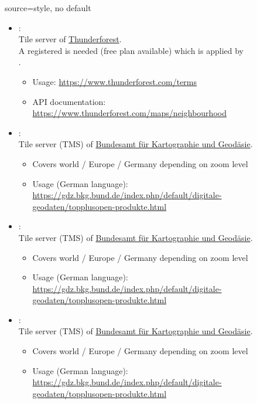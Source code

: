 \begin{docMrcKey}[supply]{source}{=}{style, no default}
\begin{itemize}
\clearpage
  \item{}:\\
    Tile server of \href{https://www.thunderforest.com}{Thunderforest}.\\
    A registered  is needed (free plan available)
    which is applied by\\
    .
    \begin{itemize}
    \item Usage: \url{https://www.thunderforest.com/terms}
    \item API documentation: \url{https://www.thunderforest.com/maps/neighbourhood}
    \end{itemize}

  \item{}:\\
    Tile server (TMS) of \href{https://www.bkg.bund.de}{Bundesamt f\"{u}r Kartographie und Geod\"{a}sie}.
    \begin{itemize}
    \item Covers world / Europe / Germany depending on zoom level
    \item Usage (German language): \url{https://gdz.bkg.bund.de/index.php/default/digitale-geodaten/topplusopen-produkte.html}
    \end{itemize}

  \item{}:\\
    Tile server (TMS) of \href{https://www.bkg.bund.de}{Bundesamt f\"{u}r Kartographie und Geod\"{a}sie}.
    \begin{itemize}
    \item Covers world / Europe / Germany depending on zoom level
    \item Usage (German language): \url{https://gdz.bkg.bund.de/index.php/default/digitale-geodaten/topplusopen-produkte.html}
    \end{itemize}

\clearpage
  \item{}:\\
    Tile server (TMS) of \href{https://www.bkg.bund.de}{Bundesamt f\"{u}r Kartographie und Geod\"{a}sie}.
    \begin{itemize}
    \item Covers world / Europe / Germany depending on zoom level
    \item Usage (German language): \url{https://gdz.bkg.bund.de/index.php/default/digitale-geodaten/topplusopen-produkte.html}
    \end{itemize}


\end{itemize}
\end{docMrcKey}
